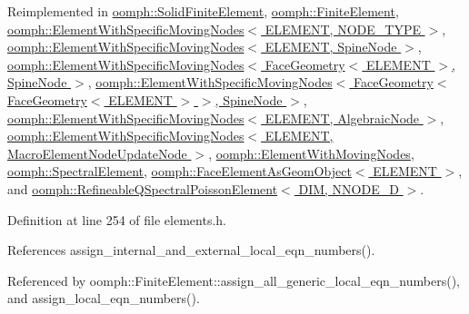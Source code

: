 Reimplemented in \hyperlink{classoomph_1_1SolidFiniteElement_ab48f9adb99fd89669434984733579a26}{oomph\+::\+Solid\+Finite\+Element}, \hyperlink{classoomph_1_1FiniteElement_a564ba080f68132762510b1ec9465b05d}{oomph\+::\+Finite\+Element}, \hyperlink{classoomph_1_1ElementWithSpecificMovingNodes_a82531e83f80254735130558f0562cdff}{oomph\+::\+Element\+With\+Specific\+Moving\+Nodes$<$ E\+L\+E\+M\+E\+N\+T, N\+O\+D\+E\+\_\+\+T\+Y\+P\+E $>$}, \hyperlink{classoomph_1_1ElementWithSpecificMovingNodes_a82531e83f80254735130558f0562cdff}{oomph\+::\+Element\+With\+Specific\+Moving\+Nodes$<$ E\+L\+E\+M\+E\+N\+T, Spine\+Node $>$}, \hyperlink{classoomph_1_1ElementWithSpecificMovingNodes_a82531e83f80254735130558f0562cdff}{oomph\+::\+Element\+With\+Specific\+Moving\+Nodes$<$ Face\+Geometry$<$ E\+L\+E\+M\+E\+N\+T $>$, Spine\+Node $>$}, \hyperlink{classoomph_1_1ElementWithSpecificMovingNodes_a82531e83f80254735130558f0562cdff}{oomph\+::\+Element\+With\+Specific\+Moving\+Nodes$<$ Face\+Geometry$<$ Face\+Geometry$<$ E\+L\+E\+M\+E\+N\+T $>$ $>$, Spine\+Node $>$}, \hyperlink{classoomph_1_1ElementWithSpecificMovingNodes_a82531e83f80254735130558f0562cdff}{oomph\+::\+Element\+With\+Specific\+Moving\+Nodes$<$ E\+L\+E\+M\+E\+N\+T, Algebraic\+Node $>$}, \hyperlink{classoomph_1_1ElementWithSpecificMovingNodes_a82531e83f80254735130558f0562cdff}{oomph\+::\+Element\+With\+Specific\+Moving\+Nodes$<$ E\+L\+E\+M\+E\+N\+T, Macro\+Element\+Node\+Update\+Node $>$}, \hyperlink{classoomph_1_1ElementWithMovingNodes_a5fdaf955e508b80e5fd5673f574472d5}{oomph\+::\+Element\+With\+Moving\+Nodes}, \hyperlink{classoomph_1_1SpectralElement_a36eeaa010b3a66ac9ee1556ee7dcc23d}{oomph\+::\+Spectral\+Element}, \hyperlink{classoomph_1_1FaceElementAsGeomObject_a744885ae07ad0e4091d43dd349aa699a}{oomph\+::\+Face\+Element\+As\+Geom\+Object$<$ E\+L\+E\+M\+E\+N\+T $>$}, and \hyperlink{classoomph_1_1RefineableQSpectralPoissonElement_ac6e937b985ab8af65695dd502f48ab43}{oomph\+::\+Refineable\+Q\+Spectral\+Poisson\+Element$<$ D\+I\+M, N\+N\+O\+D\+E\+\_\+D $>$}.



Definition at line 254 of file elements.\+h.



References assign\+\_\+internal\+\_\+and\+\_\+external\+\_\+local\+\_\+eqn\+\_\+numbers().



Referenced by oomph\+::\+Finite\+Element\+::assign\+\_\+all\+\_\+generic\+\_\+local\+\_\+eqn\+\_\+numbers(), and assign\+\_\+local\+\_\+eqn\+\_\+numbers().


